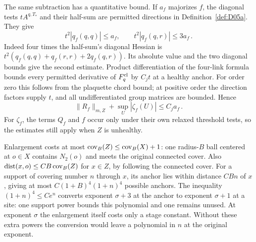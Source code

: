 The same subtraction has a quantitative bound. If $a_f$ majorizes $f$, the diagonal tests $tA^{q,T_*}$ and their half-sum are permitted directions in Definition~\ref{def:D05a}. They give
\begin{equation}\label{eq:D-projection-bound}
t^2|q_f(q,q)|\le a_f,\qquad t^2|q_f(q,r)|\le3a_f\,.
\end{equation}
Indeed four times the half-sum's diagonal Hessian is $t^2(q_f(q,q)+q_f(r,r)+2q_f(q,r))$. Its absolute value and the two diagonal bounds give the second estimate. Product differentiation of the four-link formula bounds every permitted derivative of $F^{\rm cl}_q$ by $C_jt$ at a healthy anchor. For order zero this follows from the plaquette chord bound; at positive order the direction factors supply $t$, and all undifferentiated group matrices are bounded. Hence
\begin{equation}\label{eq:D-remainder-bound}
\|R_f\|_{m,Z}+\sup_U|\zeta_f(U)|\le C_j a_f\,.
\end{equation}
For $\zeta_f$, the terms $Q_f$ and $f$ occur only under their own relaxed threshold tests, so the estimates still apply when $Z$ is unhealthy.

Enlargement costs at most $\operatorname{cov}_B(Z)\le\operatorname{cov}_B(X)+1$: one radius-$B$ ball centered at $o\in X$ contains $N_2(o)$ and meets the original connected cover. Also $\operatorname{dist}(x,o)\le C B\operatorname{cov}_B(Z)$ for $x\in Z$, by following the connected cover. For a support of covering number $n$ through $x$, its anchor lies within distance $C Bn$ of $x$, giving at most $C(1+B)^4(1+n)^4$ possible anchors. The inequality $(1+n)^4\le C e^n$ converts exponent $\sigma+3$ at the anchor to exponent $\sigma+1$ at a site: one support power bounds this polynomial and one remains unused. At exponent $\sigma$ the enlargement itself costs only a stage constant. Without these extra powers the conversion would leave a polynomial in $n$ at the original exponent.


